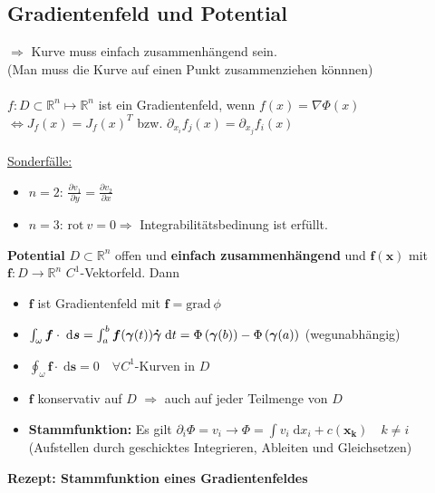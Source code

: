 \documentclass[6pt,a4paper]{scrartcl}
\renewcommand{\vec}[1]{\ensuremath{\boldsymbol {#1}}}											%
\renewcommand{\emph}[1]{\textbf{#1}}															%
\renewcommand*{\dot}[1]{\accentset{\mbox{\textrm{\large\bfseries .}} }{#1}}						%
\newcommand{\Ra}[0]{\ensuremath{\Rightarrow}}									%
\newcommand{\ra}[0]{\ensuremath{\rightarrow}} 									%
\newcommand{\diff}{\ensuremath{\;\mathrm d}}									%
\newcommand{\grad}{\ensuremath{\mathrm{grad}\ }}								%
\newcommand{\rot}{\ensuremath{\mathrm{rot}\ }}									%
\newcommand{\R}{\ensuremath{\mathbb R}}
\begin{document}
\begin{multicols*}{4}
\subsection{Gradientenfeld und Potential} %
$\Ra$ Kurve muss einfach zusammenhängend sein. \\
(Man muss die Kurve auf einen Punkt zusammenziehen könnnen) \\ \\
$f:D \subset \R^n \mapsto \R^n$ ist ein Gradientenfeld, wenn $f(x) = \nabla{\Phi(x)}$ \\
$\Leftrightarrow \boxed{J_f(x) = J_f(x)^T}$ bzw. $\partial_{x_i}f_j(x) = \partial_{x_j}f_i(x)$ \\ \\
\underline{Sonderfälle:}
\begin{itemize} \itemsep0pt
	\item $n = 2$: $\frac{\partial v_1}{\partial y} = \frac{\partial v_2}{\partial x}$
	\item $n = 3$: $\rot v = 0 \Ra $ Integrabilitätsbedinung ist erfüllt.
\end{itemize}

\textbf{Potential}
$D \subset \R^n$ offen und \emph{einfach zusammenhängend} und $\vec{f}(\vec{x})$ mit $\vec{f}:D \ra \R^n$ $C^1$-Vektorfeld.
Dann
\begin{itemize}
	\item $\vec{f}$ ist Gradientenfeld mit $\vec{f} = \grad{\phi}$
	\item $\int_{\omega}{\vec{f} \cdot \diff \vec{s}} = \int_a^b \vec f(\vec \gamma(t)) \dot{\vec \gamma} \diff t = \Phi\left(\vec{\gamma}(b)\right) - \Phi\left(\vec{\gamma}(a)\right)$ (wegunabhängig)
	\item $\oint_{\omega}{\vec{f} \cdot \diff \vec{s}} = 0 \quad \forall C^1$-Kurven in $D$
	\item $\vec{f}$ konservativ auf $D$ $\Ra$ auch auf jeder Teilmenge von $D$
	\item \emph{Stammfunktion:} Es gilt $\partial_i \Phi = v_i \ra \Phi = \int{v_i \diff x_i} + c(\vec{x_k}) \quad k \neq i$ (Aufstellen durch geschicktes Integrieren, Ableiten und Gleichsetzen)
\end{itemize}


\textbf{Rezept: Stammfunktion eines Gradientenfeldes} \\


\end{multicols*}
\end{document}
